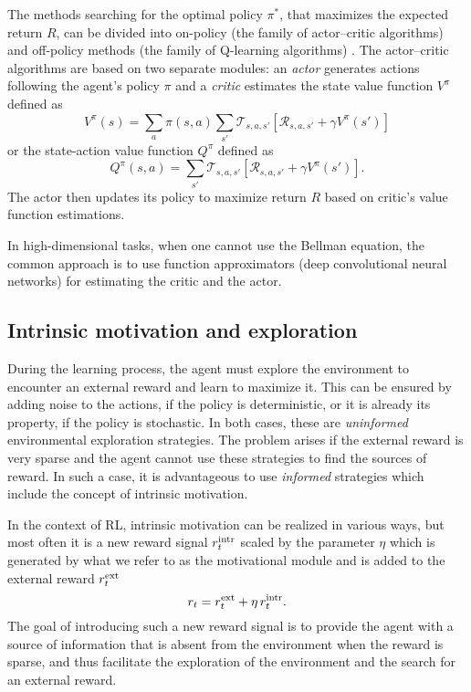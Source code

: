 \documentclass[a4paper,11pt]{elsarticle}
\begin{document}
The methods searching for the optimal policy $\pi^{*}$, that maximizes the expected return $R$, can be divided into on-policy (the family of actor--critic algorithms) \cite{schulman2017proximal}
and off-policy methods (the family of Q-learning algorithms) \cite{mnih2013playing}.
The actor--critic algorithms are based on two separate modules: an \textit{actor} generates actions following the agent's policy $\pi$ and a \textit{critic} estimates the state value function $V^{\pi}$ defined as
$$
V^{\pi}(s) = \sum_a \pi(s,a) \sum_{s'} \mathcal{T}_{s,a,s'} \left[ \mathcal{R}_{s,a,s'} + \gamma V^{\pi}(s') \right]
$$
or the state-action value function $Q^{\pi}$ defined as
$$
Q^{\pi}(s,a) = \sum_{s'} \mathcal{T}_{s,a,s'} \left[ \mathcal{R}_{s,a,s'} + \gamma V^{\pi}(s') \right].
$$
The actor then updates its policy to maximize return $R$ based on critic's value function estimations.

In high-dimensional tasks, when one cannot use the Bellman equation, the common approach is to use function approximators (deep convolutional neural networks) for estimating the critic and the actor.

\subsection{Intrinsic motivation and exploration}

During the learning process, the agent must explore the environment to encounter an external reward and learn to maximize it. This can be ensured by adding noise to the actions, if the policy is deterministic, or it is already its property, if the policy is stochastic. In both cases, these are {\it uninformed} environmental exploration strategies. The problem arises if the external reward is very sparse and the agent cannot use these strategies to find the sources of reward. In such a case, it is advantageous to use {\it informed} strategies which include the concept of intrinsic motivation.

In the context of RL, intrinsic motivation can be realized in various ways, but most often it is a new reward signal $r^{\rm intr}_t$ scaled by the parameter $\eta$ which is generated by what we refer to as the motivational module and is added to the external reward $r^{\rm ext}_t$
\begin{equation}
\label{eq:rintr}
  r_t = r_t^{\rm ext} + \eta \, r_t^{\rm intr}.
\end{equation}
The goal of introducing such a new reward signal is to provide the agent with a source of information that is absent from the environment when the reward is sparse, and thus facilitate the exploration of the environment and the search for an external reward.
\end{document}
